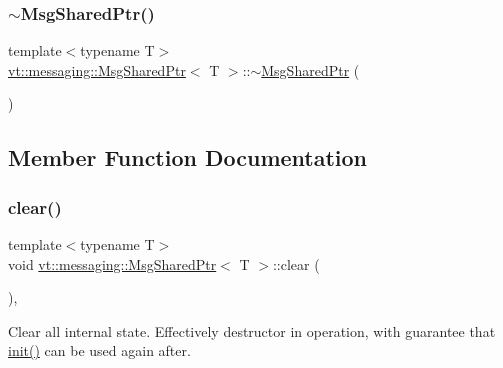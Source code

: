 \mbox{\label{structvt_1_1messaging_1_1_msg_shared_ptr_a41b62019acea0627ce3297d31257524c}} 
\subsubsection{\texorpdfstring{$\sim$\+Msg\+Shared\+Ptr()}{~MsgSharedPtr()}}
{\footnotesize\ttfamily template$<$typename T$>$ \\
\hyperlink{structvt_1_1messaging_1_1_msg_shared_ptr}{vt\+::messaging\+::\+Msg\+Shared\+Ptr}$<$ T $>$\+::$\sim$\hyperlink{structvt_1_1messaging_1_1_msg_shared_ptr}{Msg\+Shared\+Ptr} (\begin{DoxyParamCaption}{ }\end{DoxyParamCaption})\hspace{0.3cm}{\ttfamily [inline]}}



\subsection{Member Function Documentation}
\mbox{\label{structvt_1_1messaging_1_1_msg_shared_ptr_ace4439c8585f3d3c50b861570db07d99}} 
\subsubsection{\texorpdfstring{clear()}{clear()}}
{\footnotesize\ttfamily template$<$typename T$>$ \\
void \hyperlink{structvt_1_1messaging_1_1_msg_shared_ptr}{vt\+::messaging\+::\+Msg\+Shared\+Ptr}$<$ T $>$\+::clear (\begin{DoxyParamCaption}{ }\end{DoxyParamCaption})\hspace{0.3cm}{\ttfamily [inline]}, {\ttfamily [private]}}

Clear all internal state. Effectively destructor in operation, with guarantee that \hyperlink{structvt_1_1messaging_1_1_msg_shared_ptr_a780631de45b6dfb6812abb9af26cb4e8}{init()} can be used again after. \mbox{\label{structvt_1_1messaging_1_1_msg_shared_ptr_a6e6e25e087e662d9171fa20b5092efdd}} 
